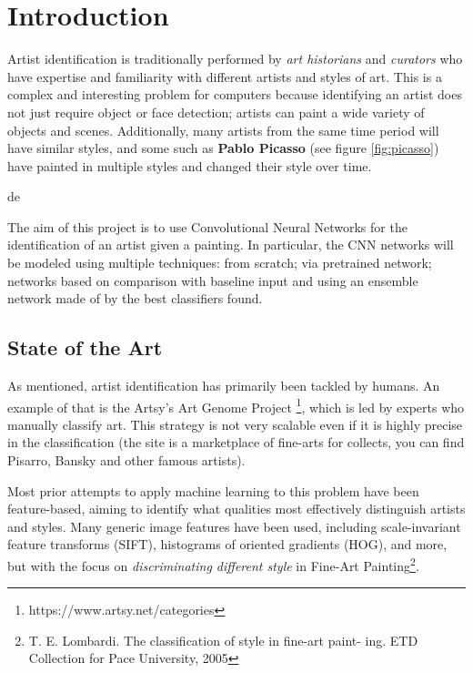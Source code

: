 \section{Introduction}
Artist identification is traditionally performed by \textit{art historians} and \textit{curators} who have expertise and familiarity with different artists and styles of art. This is a complex and interesting problem for computers because identifying an artist does not just require object or face detection; artists can paint a wide variety of objects and scenes. Additionally, many artists from the same time period will have similar styles, and some such as \textbf{Pablo Picasso} (see figure \ref{fig:picasso}) have painted in multiple styles and changed their style over time.

de

\noindent The aim of this project is to use Convolutional Neural Networks for the identification of an artist given a painting. In particular, the CNN networks will be modeled using multiple techniques: from scratch; via pretrained network; networks based on comparison with baseline input and using an ensemble network made of by the best classifiers found.


\subsection{State of the Art}
As mentioned, artist identification has primarily been tackled by humans. An example of that is the Artsy's Art Genome Project \footnote{https://www.artsy.net/categories}, which is led by experts who manually classify art. This strategy is not very scalable even if it is highly precise in the classification (the site is a marketplace of fine-arts for collects, you can find Pisarro, Bansky and other famous artists).

Most prior attempts to apply machine learning to this problem have been feature-based, aiming to identify what qualities most effectively distinguish artists and styles. Many generic image features have been used, including scale-invariant feature transforms (SIFT), histograms of oriented gradients (HOG), and more, but with the focus on \textit{discriminating different style} in Fine-Art Painting\footnote{T. E. Lombardi. The classification of style in fine-art paint-
ing. ETD Collection for Pace University, 2005}.

